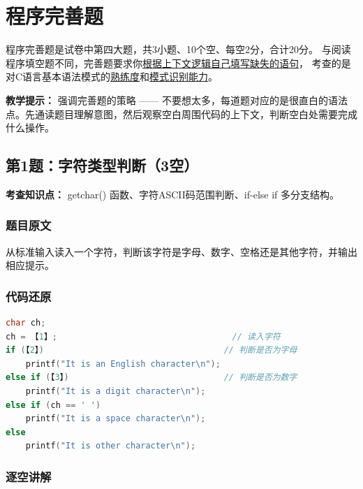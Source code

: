 \section{程序完善题}

程序完善题是试卷中第四大题，共3小题、10个空、每空2分，合计20分。
与阅读程序填空题不同，完善题要求你\underline{根据上下文逻辑自己填写缺失的语句}，
考查的是对C语言基本语法模式的\underline{熟练度}和\underline{模式识别能力}。

\textbf{教学提示：} 强调完善题的策略 —— 不要想太多，每道题对应的是很直白的语法点。先通读题目理解意图，然后观察空白周围代码的上下文，判断空白处需要完成什么操作。

\bigskip

\subsection{第1题：字符类型判断（3空）}

\textbf{考查知识点：} getchar() 函数、字符ASCII码范围判断、if-else if 多分支结构。

\subsubsection{题目原文}

从标准输入读入一个字符，判断该字符是字母、数字、空格还是其他字符，并输出相应提示。

\subsubsection{代码还原}

\begin{lstlisting}[language=C]
char ch;
ch = 【1】;                                   // 读入字符
if (【2】)                                    // 判断是否为字母
    printf("It is an English character\n");
else if (【3】)                               // 判断是否为数字
    printf("It is a digit character\n");
else if (ch == ' ')
    printf("It is a space character\n");
else
    printf("It is other character\n");
\end{lstlisting}

\subsubsection{逐空讲解}

